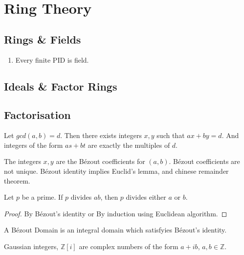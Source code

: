\section{Ring Theory}

\subsection{Rings \& Fields}
\begin{enumerate}
	\item Every finite PID is field.
\end{enumerate}

\subsection{Ideals \& Factor Rings}

\subsection{Factorisation}
\begin{lemma}[B\'ezout]
	Let $gcd(a,b) = d$. Then there exists integers $x,y$ such that $ax+by = d$. And integers of the form $as+bt$ are exactly the multiples of $d$.
\end{lemma}

	The integers $x,y$ are the B\'ezout coefficients for $(a,b)$. B\'ezout coefficients are not unique.
	B\'ezout identity implies Euclid's lemma, and chinese remainder theorem.

\begin{lemma}[Euclid]
	Let $p$ be a prime. If $p$ divides $ab$, then $p$ divides either $a$ or $b$.
\end{lemma}
\begin{proof}
	By B\'ezout's identity or By induction using Euclidean algorithm.
\end{proof}

\begin{theorem}

\end{theorem}

\begin{definition}
	A B\'ezout Domain is an integral domain which satisfyies B\'ezout's identity.
\end{definition}

\begin{definition}
	Gaussian integers, $\mathbb{Z}[i]$ are complex numbers of the form $a+ib$, $a,b \in \mathbb{Z}$.
\end{definition}

